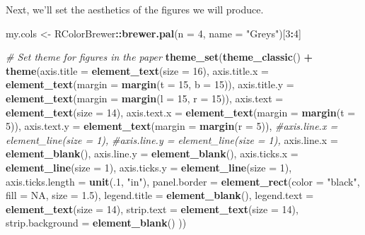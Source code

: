 \documentclass[]{article}
\newenvironment{Shaded}{\begin{snugshade}}{\end{snugshade}}
\newcommand{\CommentTok}[1]{\textcolor[rgb]{0.56,0.35,0.01}{\textit{#1}}}
\newcommand{\DataTypeTok}[1]{\textcolor[rgb]{0.13,0.29,0.53}{#1}}
\newcommand{\DecValTok}[1]{\textcolor[rgb]{0.00,0.00,0.81}{#1}}
\newcommand{\FloatTok}[1]{\textcolor[rgb]{0.00,0.00,0.81}{#1}}
\newcommand{\KeywordTok}[1]{\textcolor[rgb]{0.13,0.29,0.53}{\textbf{#1}}}
\newcommand{\NormalTok}[1]{#1}
\newcommand{\OperatorTok}[1]{\textcolor[rgb]{0.81,0.36,0.00}{\textbf{#1}}}
\newcommand{\OtherTok}[1]{\textcolor[rgb]{0.56,0.35,0.01}{#1}}
\newcommand{\StringTok}[1]{\textcolor[rgb]{0.31,0.60,0.02}{#1}}
\begin{document}
Next, we'll set the aesthetics of the figures we will produce.

\begin{Shaded}
\begin{Highlighting}[]
\NormalTok{my.cols <-}\StringTok{ }\NormalTok{RColorBrewer}\OperatorTok{::}\KeywordTok{brewer.pal}\NormalTok{(}\DataTypeTok{n =} \DecValTok{4}\NormalTok{, }\DataTypeTok{name =} \StringTok{"Greys"}\NormalTok{)[}\DecValTok{3}\OperatorTok{:}\DecValTok{4}\NormalTok{]}

\CommentTok{# Set theme for figures in the paper}
\KeywordTok{theme_set}\NormalTok{(}\KeywordTok{theme_classic}\NormalTok{() }\OperatorTok{+}\StringTok{ }
\StringTok{  }\KeywordTok{theme}\NormalTok{(}\DataTypeTok{axis.title =} \KeywordTok{element_text}\NormalTok{(}\DataTypeTok{size =} \DecValTok{16}\NormalTok{),}
        \DataTypeTok{axis.title.x =} \KeywordTok{element_text}\NormalTok{(}\DataTypeTok{margin =} \KeywordTok{margin}\NormalTok{(}\DataTypeTok{t =} \DecValTok{15}\NormalTok{, }\DataTypeTok{b =} \DecValTok{15}\NormalTok{)),}
        \DataTypeTok{axis.title.y =} \KeywordTok{element_text}\NormalTok{(}\DataTypeTok{margin =} \KeywordTok{margin}\NormalTok{(}\DataTypeTok{l =} \DecValTok{15}\NormalTok{, }\DataTypeTok{r =} \DecValTok{15}\NormalTok{)),}
        \DataTypeTok{axis.text =} \KeywordTok{element_text}\NormalTok{(}\DataTypeTok{size =} \DecValTok{14}\NormalTok{),}
        \DataTypeTok{axis.text.x =} \KeywordTok{element_text}\NormalTok{(}\DataTypeTok{margin =} \KeywordTok{margin}\NormalTok{(}\DataTypeTok{t =} \DecValTok{5}\NormalTok{)),}
        \DataTypeTok{axis.text.y =} \KeywordTok{element_text}\NormalTok{(}\DataTypeTok{margin =} \KeywordTok{margin}\NormalTok{(}\DataTypeTok{r =} \DecValTok{5}\NormalTok{)),}
        \CommentTok{#axis.line.x = element_line(size = 1),}
        \CommentTok{#axis.line.y = element_line(size = 1),}
        \DataTypeTok{axis.line.x =} \KeywordTok{element_blank}\NormalTok{(),}
        \DataTypeTok{axis.line.y =} \KeywordTok{element_blank}\NormalTok{(),}
        \DataTypeTok{axis.ticks.x =} \KeywordTok{element_line}\NormalTok{(}\DataTypeTok{size =} \DecValTok{1}\NormalTok{),}
        \DataTypeTok{axis.ticks.y =} \KeywordTok{element_line}\NormalTok{(}\DataTypeTok{size =} \DecValTok{1}\NormalTok{),}
        \DataTypeTok{axis.ticks.length =} \KeywordTok{unit}\NormalTok{(.}\DecValTok{1}\NormalTok{, }\StringTok{"in"}\NormalTok{),}
        \DataTypeTok{panel.border =} \KeywordTok{element_rect}\NormalTok{(}\DataTypeTok{color =} \StringTok{"black"}\NormalTok{, }\DataTypeTok{fill =} \OtherTok{NA}\NormalTok{, }\DataTypeTok{size =} \FloatTok{1.5}\NormalTok{),}
        \DataTypeTok{legend.title =} \KeywordTok{element_blank}\NormalTok{(),}
        \DataTypeTok{legend.text =} \KeywordTok{element_text}\NormalTok{(}\DataTypeTok{size =} \DecValTok{14}\NormalTok{),}
        \DataTypeTok{strip.text =} \KeywordTok{element_text}\NormalTok{(}\DataTypeTok{size =} \DecValTok{14}\NormalTok{),}
        \DataTypeTok{strip.background =} \KeywordTok{element_blank}\NormalTok{()}
\NormalTok{        ))}
\end{Highlighting}
\end{Shaded}
\end{document}
